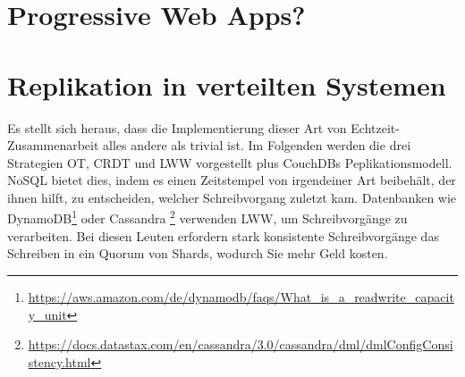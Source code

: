 \section{Progressive Web Apps?}
%
%
\section{Replikation in verteilten Systemen}
Es stellt sich heraus, dass die Implementierung dieser Art von Echtzeit-Zusammenarbeit alles andere als trivial ist.
Im Folgenden werden die drei Strategien \gls{OT}, \gls{CRDT} und \gls{LWW} vorgestellt plus CouchDBs Peplikationsmodell.
%
%
NoSQL bietet dies, indem es einen Zeitstempel von irgendeiner Art beibehält, der ihnen hilft, zu entscheiden, welcher Schreibvorgang zuletzt kam. Datenbanken wie DynamoDB\footnote{\url{https://aws.amazon.com/de/dynamodb/faqs/What_is_a_readwrite_capacity_unit}} oder Cassandra \footnote{\url{https://docs.datastax.com/en/cassandra/3.0/cassandra/dml/dmlConfigConsistency.html}} verwenden LWW, um Schreibvorgänge zu verarbeiten. Bei diesen Leuten erfordern stark konsistente Schreibvorgänge das Schreiben in ein Quorum von Shards, wodurch Sie mehr Geld kosten.
%
%

%
%

%
%

